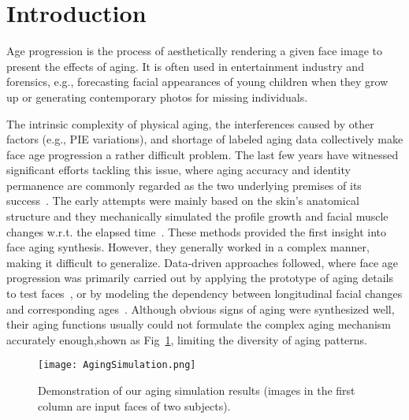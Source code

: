 \documentclass[10pt,twocolumn,letterpaper]{article}
\begin{document}
\section{Introduction}
Age progression is the process of aesthetically rendering
a given face image to present the effects of aging. It is often
used in entertainment industry and forensics, e.g., forecasting
facial appearances of young children when they grow up
or generating contemporary photos for missing individuals.\par
The intrinsic complexity of physical aging, the interferences
caused by other factors (e.g., PIE variations), and
shortage of labeled aging data collectively make face age
progression a rather difficult problem. The last few years
have witnessed significant efforts tackling this issue, where
aging accuracy and identity permanence are commonly
regarded as the two underlying premises of its success~\cite{Jinli2010A}\cite{Yang2016Face}\cite{Shu2015Personalized}\cite{Lanitis2009Evaluating}. The early attempts were mainly based on
the skin’s anatomical structure and they mechanically simulated
the profile growth and facial muscle changes w.r.t.
the elapsed time~\cite{Todd1980The}\cite{Ramanathan2008Modeling}. These methods provided the first insight into face aging synthesis. However, they generally
worked in a complex manner, making it difficult to
generalize. Data-driven approaches followed, where face
age progression was primarily carried out by applying the
prototype of aging details to test faces~\cite{Kemelmacher2014Illumination}\cite{Jinli2010A}, or by modeling
the dependency between longitudinal facial changes
and corresponding ages~\cite{Suo2012A}\cite{Wang2012Combining}\cite{Park2010Age}. Although obvious
signs of aging were synthesized well, their aging functions
usually could not formulate the complex aging mechanism
accurately enough,shown as Fig~\ref{fig:results}, limiting the diversity of aging patterns.\par
\begin{figure}[!htb]
\begin{center}
   \texttt{[image: AgingSimulation.png]}
\end{center}
   \caption{Demonstration of our aging simulation results (images
in the first column are input faces of two subjects).}
\label{fig:results}
\end{figure}


{\small


}
\end{document}

